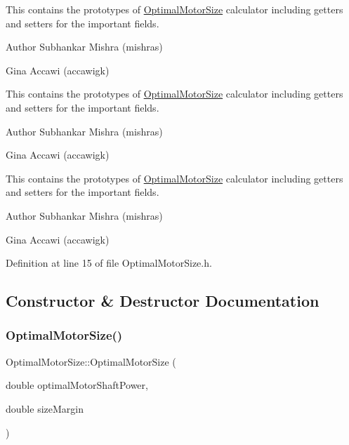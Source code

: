 This contains the prototypes of \hyperlink{class_optimal_motor_size}{Optimal\+Motor\+Size} calculator including getters and setters for the important fields.

\begin{DoxyAuthor}{Author}
Subhankar Mishra (mishras) 

Gina Accawi (accawigk) 
\end{DoxyAuthor}


This contains the prototypes of \hyperlink{class_optimal_motor_size}{Optimal\+Motor\+Size} calculator including getters and setters for the important fields.

\begin{DoxyAuthor}{Author}
Subhankar Mishra (mishras) 

Gina Accawi (accawigk) 
\end{DoxyAuthor}


This contains the prototypes of \hyperlink{class_optimal_motor_size}{Optimal\+Motor\+Size} calculator including getters and setters for the important fields.

\begin{DoxyAuthor}{Author}
Subhankar Mishra (mishras) 

Gina Accawi (accawigk) 
\end{DoxyAuthor}


Definition at line 15 of file Optimal\+Motor\+Size.\+h.



\subsection{Constructor \& Destructor Documentation}
\mbox{\label{class_optimal_motor_size_ad051dd00b8879fc4232536c936e98be1}} 
\subsubsection{\texorpdfstring{Optimal\+Motor\+Size()}{OptimalMotorSize()}\hspace{0.1cm}{\footnotesize\ttfamily [1/3]}}
{\footnotesize\ttfamily Optimal\+Motor\+Size\+::\+Optimal\+Motor\+Size (\begin{DoxyParamCaption}\item[{double}]{optimal\+Motor\+Shaft\+Power,  }\item[{double}]{size\+Margin }\end{DoxyParamCaption})\hspace{0.3cm}{\ttfamily [inline]}}

